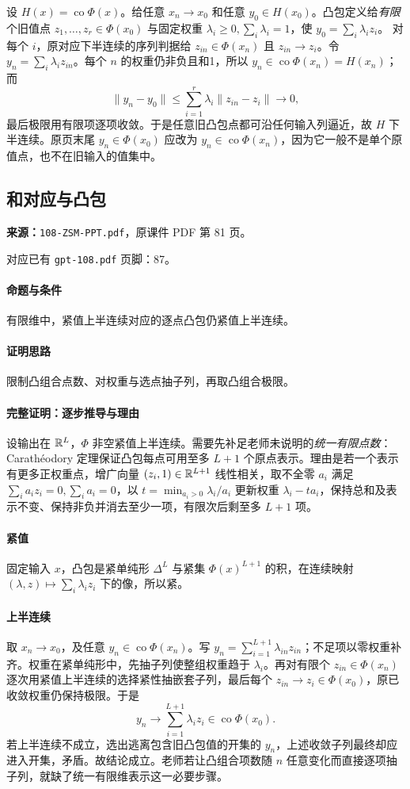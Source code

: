设 $H(x)=\operatorname{co}\Phi(x)$。给任意 $x_n\to x_0$ 和任意 $y_0\in H(x_0)$。凸包定义给\emph{有限}个旧值点 $z_1,\ldots,z_r\in\Phi(x_0)$ 与固定权重 $\lambda_i\ge0,\sum_i\lambda_i=1$，使 $y_0=\sum_i\lambda_i z_i$。
对每个 $i$，原对应下半连续的序列判据给 $z_{in}\in\Phi(x_n)$ 且 $z_{in}\to z_i$。令 $y_n=\sum_i\lambda_i z_{in}$。每个 $n$ 的权重仍非负且和1，所以 $y_n\in\operatorname{co}\Phi(x_n)=H(x_n)$；而
\[\|y_n-y_0\|\le\sum_{i=1}^r\lambda_i\|z_{in}-z_i\|\to0,\]
最后极限用有限项逐项收敛。于是任意旧凸包点都可沿任何输入列逼近，故 $H$ 下半连续。原页末尾 $y_n\in\Phi(x_0)$ 应改为 $y_n\in\operatorname{co}\Phi(x_n)$，因为它一般不是单个原值点，也不在旧输入的值集中。

\clearpage\subsection{和对应与凸包}
\textbf{来源：}\texttt{108-ZSM-PPT.pdf}，原课件 PDF 第 81 页。\par
对应已有 \texttt{gpt-108.pdf} 页脚：87。\par
\paragraph{命题与条件}有限维中，紧值上半连续对应的逐点凸包仍紧值上半连续。
\paragraph{证明思路}限制凸组合点数、对权重与选点抽子列，再取凸组合极限。
\paragraph{完整证明：逐步推导与理由}

设输出在 $\mathbb{R}^L$，$\Phi$ 非空紧值上半连续。需要先补足老师未说明的\emph{统一有限点数}：Carathéodory 定理保证凸包每点可用至多 $L+1$ 个原点表示。理由是若一个表示有更多正权重点，增广向量 $(z_i,1)\in\mathbb{R}^{L+1}$ 线性相关，取不全零 $a_i$ 满足 $\sum_i a_iz_i=0,\sum_i a_i=0$，以 $t=\min_{a_i>0}\lambda_i/a_i$ 更新权重 $\lambda_i-ta_i$，保持总和及表示不变、保持非负并消去至少一项，有限次后剩至多 $L+1$ 项。
\paragraph{紧值}固定输入 $x$，凸包是紧单纯形 $\Delta^L$ 与紧集 $\Phi(x)^{L+1}$ 的积，在连续映射 $(\lambda,z)\mapsto\sum_i\lambda_i z_i$ 下的像，所以紧。
\paragraph{上半连续}取 $x_n\to x_0$，及任意 $y_n\in\operatorname{co}\Phi(x_n)$。写 $y_n=\sum_{i=1}^{L+1}\lambda_{in}z_{in}$；不足项以零权重补齐。权重在紧单纯形中，先抽子列使整组权重趋于 $\lambda_i$。再对有限个 $z_{in}\in\Phi(x_n)$ 逐次用紧值上半连续的选择紧性抽嵌套子列，最后每个 $z_{in}\to z_i\in\Phi(x_0)$，原已收敛权重仍保持极限。于是
\[y_n\to\sum_{i=1}^{L+1}\lambda_i z_i\in\operatorname{co}\Phi(x_0).\]
若上半连续不成立，选出逃离包含旧凸包值的开集的 $y_n$，上述收敛子列最终却应进入开集，矛盾。故结论成立。老师若让凸组合项数随 $n$ 任意变化而直接逐项抽子列，就缺了统一有限维表示这一必要步骤。

